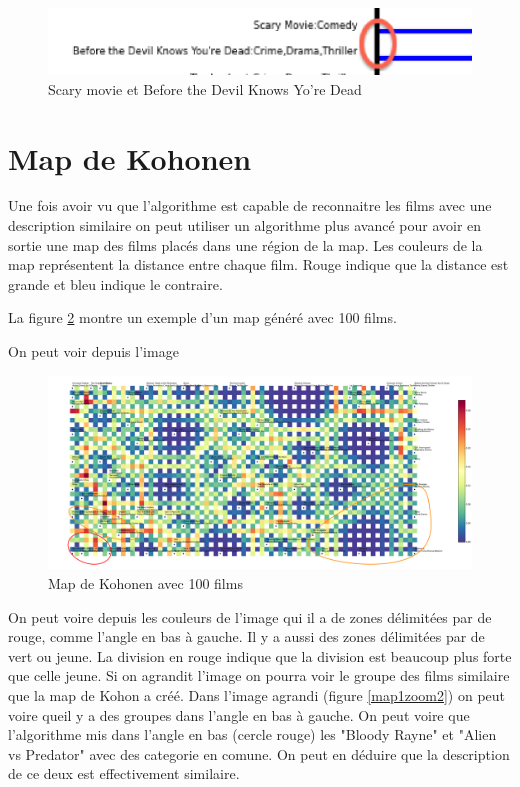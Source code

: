 		\begin{figure}[h]
			  \centering
			    \includegraphics[width=0.5\linewidth]{img/scarymovie.png}
			  \caption{Scary movie et Before the Devil Knows Yo're Dead}
			  \label{scarymovie}
			\end{figure}


	
\section{Map de Kohonen}

Une fois avoir vu que l'algorithme est capable de reconnaitre les films avec une description similaire on peut utiliser un algorithme plus avancé pour avoir en sortie une map des films placés dans une région de la map. Les couleurs de la map représentent la distance entre chaque film. Rouge indique que la distance est grande et bleu indique le contraire.

La figure \ref{map1} montre un exemple d'un map généré avec 100 films.

On peut voir depuis l'image
\begin{figure}[h]
	\centering
	\includegraphics[width=1\linewidth]{img/map-cluster.png}
	\caption{Map de Kohonen avec 100 films}
	\label{map1}
\end{figure}

On peut voire depuis les couleurs de l'image qui il a de zones délimitées par de rouge, comme l'angle en bas à gauche. Il y a aussi des zones délimitées par de vert ou jeune. La division en rouge indique que la division est beaucoup plus forte que celle jeune. Si on agrandit l'image on pourra voir le groupe des films similaire que la map de Kohon a créé.
Dans l'image agrandi (figure \ref{map1zoom2}) on peut voire queil y a des groupes dans l'angle en bas à gauche. On peut voire que l'algorithme mis dans l'angle en bas (cercle rouge) les "Bloody Rayne" et "Alien vs Predator" avec des categorie en comune. On peut en déduire que la description de ce deux est effectivement similaire.

